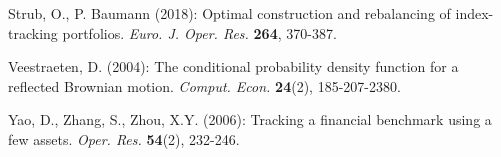 \documentclass[11pt,times,letter]{article}
\numberwithin{equation}{section}
\begin{document}
\begin{thebibliography}{}
{ Strub, O., P. Baumann (2018): Optimal construction and rebalancing of index-tracking portfolios. {\it Euro. J. Oper. Res.} {\bf 264}, 370-387.

 Veestraeten, D. (2004): The conditional probability density function for a reflected Brownian motion. {\it Comput. Econ.} \textbf{24}(2), 185-207-2380.

 Yao, D., Zhang, S., Zhou, X.Y. (2006): Tracking a financial benchmark using a few assets. {\it Oper. Res.} {\bf 54}(2), 232-246.
}
\end{thebibliography}
\end{document}
